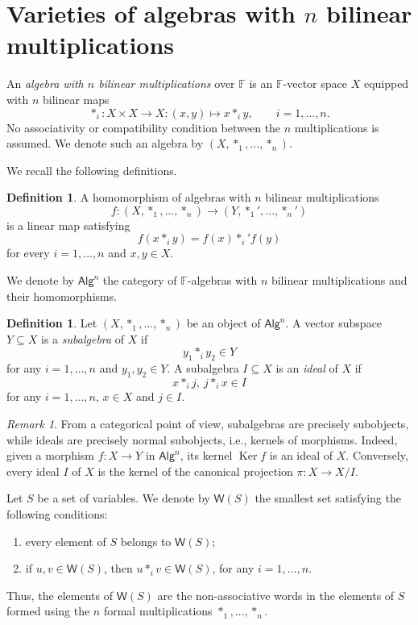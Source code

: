 \documentclass[reqno,a4paper]{amsart}
\theoremstyle{plain}
\theoremstyle{definition}
\newtheorem{definition}[subsection]{Definition}
\theoremstyle{remark}
\newtheorem{remark}[subsection]{Remark}
\numberwithin{equation}{section}
\newcommand{\F}{\mathbb{F}}
\DeclareMathOperator{\Ker}{Ker}
\newcommand{\Alg}{\ensuremath{\mathsf{Alg}}}
\begin{document}
\section{Varieties of algebras with \texorpdfstring{$n$}{n} bilinear multiplications}\label{SecNOperations}

An \emph{algebra with $n$ bilinear multiplications} over $\F$ is an $\F$-vector space $X$ equipped with $n$ bilinear maps
\[
\ast_i \colon X\times X\to X \colon (x,y) \mapsto x \ast_i y, \qquad i=1,\ldots,n.
\]
No associativity or compatibility condition between the $n$ multiplications is assumed. We denote such an algebra by $(X,\ast_1,\ldots,\ast_n)$.

We recall the following definitions.

\begin{definition}
A homomorphism of algebras with $n$ bilinear multiplications
\[
f\colon(X,\ast_1,\ldots,\ast_n)\to(Y,\ast_1',\ldots,\ast_n')
\]
is a linear map satisfying
\[
f(x\ast_i y)=f(x)\ast_i' f(y)
\]
for every $i=1,\ldots,n$ and $x,y\in X$.
\end{definition}

We denote by $\Alg^n$ the category of $\F$-algebras with $n$ bilinear multiplications and their homomorphisms.

\begin{definition}
Let $(X,\ast_1,\ldots,\ast_n)$ be an object of $\Alg^n$. A vector subspace $Y\subseteq X$ is a \emph{subalgebra} of $X$ if
\[
y_1\ast_i y_2\in Y
\]
for any $i=1,\ldots,n$ and $y_1,y_2\in Y$. A subalgebra $I\subseteq X$ is an \emph{ideal} of $X$ if
\[
x\ast_i j,\ j\ast_i x\in I
\]
for any $i=1,\ldots,n$, $x\in X$ and $j\in I$.
\end{definition}

\begin{remark}
From a categorical point of view, subalgebras are precisely subobjects, while ideals are precisely normal subobjects, i.e., kernels of morphisms. Indeed, given a morphism $f\colon X\to Y$ in $\Alg^n$, its kernel $\Ker f$ is an ideal of $X$. Conversely, every ideal $I$ of $X$ is the kernel of the canonical projection $\pi\colon X\to X/I$.
\end{remark}

Let $S$ be a set of variables. We denote by $\mathsf{W}(S)$ the smallest set satisfying the following conditions:
\begin{enumerate}
\item every element of $S$ belongs to $\mathsf{W}(S)$;
\item if $u,v\in\mathsf{W}(S)$, then $u\ast_i v\in\mathsf{W}(S)$, for any $i=1,\ldots,n$.
\end{enumerate}
Thus, the elements of $\mathsf{W}(S)$ are the non-associative words in the elements of $S$ formed using the $n$ formal multiplications $\ast_1,\ldots,\ast_n$.
\end{document}
